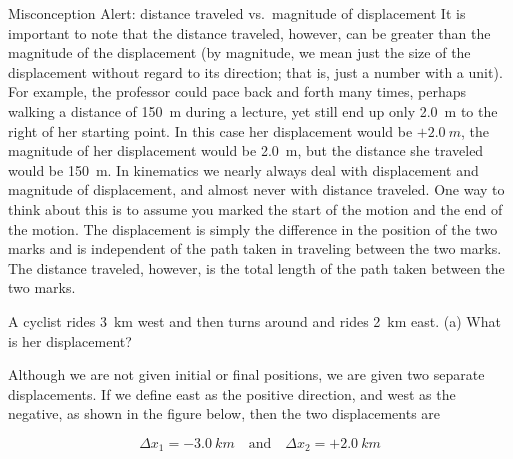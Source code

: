 \documentclass[../../main-ap-physics.tex]{subfiles}
\begin{document}
\vspace{1ex}

\begin{gradient}{Misconception Alert: distance traveled vs.~magnitude of displacement}    
    It is important to note that the distance traveled, however, can be greater than the magnitude of the displacement (by magnitude, we mean just the size of the displacement without regard to its direction; that is, just a number with a unit). For example, the professor could pace back and forth many times, perhaps walking a distance of \SI{150}{m} during a lecture, yet still end up only \SI{2.0}{m} to the right of her starting point. In this case her displacement would be $+\SI{2.0}{m}$, the magnitude of her displacement would be \SI{2.0}{m}, but the distance she traveled would be \SI{150}{m}. In kinematics we nearly always deal with displacement and magnitude of displacement, and almost never with distance traveled. One way to think about this is to assume you marked the start of the motion and the end of the motion. The displacement is simply the difference in the position of the two marks and is independent of the path taken in traveling between the two marks. The distance traveled, however, is the total length of the path taken between the two marks.
\end{gradient}

\begin{example} \label{bcBeYE}
    A cyclist rides \SI{3}{km} west and then turns around and rides \SI{2}{km} east. (a) What is her displacement? 
\end{example}

\Solution Although we are not given initial or final positions, we are given two separate displacements. If we define east as the positive direction, and west as the negative, as shown in the figure below, then the two displacements are

\begin{equation*}
    \Delta{x_1} = -\SI{3.0}{km} \quad \text{and} \quad \Delta{x_2} = +\SI{2.0}{km}
\end{equation*}

\begin{center}
\end{center}
\end{document}
